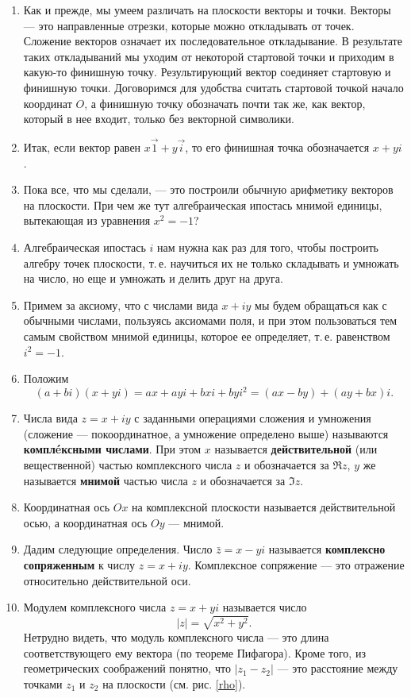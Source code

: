 \begin{enumerate}
\item Как и прежде, мы умеем различать на плоскости векторы и точки. Векторы --- это направленные отрезки, которые можно откладывать от точек. Сложение векторов означает их последовательное откладывание. В результате таких откладываний мы уходим от некоторой стартовой точки и приходим в какую-то финишную точку. Результирующий вектор соединяет стартовую и финишную точки. Договоримся для удобства считать стартовой точкой начало координат $O$, а финишную точку обозначать почти так же, как вектор, который в нее входит, только без векторной символики.
\item Итак, если вектор равен $x\vec 1+y\vec i$, то его финишная точка обозначается $x+yi$.
\item Пока все, что мы сделали, --- это построили обычную арифметику векторов на плоскости. При чем же тут алгебраическая ипостась мнимой единицы, вытекающая из уравнения $x^2=-1$?
\item Алгебраическая ипостась $i$ нам нужна как раз для того, чтобы построить алгебру точек плоскости, т.\,е. научиться их не только складывать и умножать на число, но еще и умножать и делить друг на друга.
\item Примем за аксиому, что с числами вида $x+iy$ мы будем обращаться как с обычными числами, пользуясь аксиомами поля, и при этом пользоваться тем самым свойством мнимой единицы, которое ее определяет, т.\,е. равенством $i^2=-1$.
\item Положим
\begin{equation}\label{complex_mult}
(a+bi)(x+yi) = ax + ayi + bxi + byi^2 = (ax-by) + (ay+bx)i.
\end{equation}
\item Числа вида $z=x+iy$ с заданными операциями сложения и умножения (сложение --- покоординатное, а умножение определено выше) называются \textbf{компл\'eксными числами}. При этом $x$ называется \textbf{действительной} (или вещественной) частью комплексного числа $z$ и обозначается за $\Re z$, $y$ же называется \textbf{мнимой} частью числа $z$ и обозначается за $\Im z$.
\item Координатная ось $Ox$ на комплексной плоскости называется действительной осью, а координатная ось $Oy$ --- мнимой.
\item Дадим следующие определения. Число $\bar z=x-yi$ называется \textbf{комплексно сопряженным} к числу $z=x+iy$. Комплексное сопряжение --- это отражение относительно действительной оси.
\item Модулем комплексного числа $z=x+yi$ называется число $$|z|=\sqrt{x^2+y^2}.$$
Нетрудно видеть, что модуль комплексного числа --- это длина соответствующего ему вектора (по теореме Пифагора). Кроме того, из геометрических соображений понятно, что $|z_1-z_2|$ --- это расстояние между точками $z_1$ и $z_2$ на плоскости (см. рис. \ref{rho}).


\end{enumerate}
